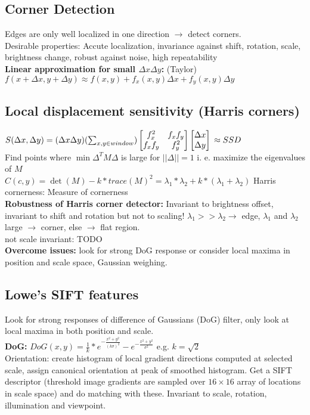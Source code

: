 \subsection*{Corner Detection}
Edges are only well localized in one direction $\rightarrow$ detect corners.\\
Desirable properties: Accute localization, invariance against shift, rotation, scale, brightness change, robust against noise, high repeatability\\
\textbf{Linear approximation for small $\Delta x \Delta y$:} (Taylor) $f(x + \Delta x, y + \Delta y) \approx f(x, y) + f_x(x, y) \Delta x + f_y(x, y)\Delta y$\\
\subsection*{Local displacement sensitivity (Harris corners)}
$S (\Delta x, \Delta y) = (\Delta x \Delta y) (\sum_{x, y \in window })
\begin{bmatrix} 
    f_x^{2} & f_x f_y \\ 
    f_x  f_y & f_y^{2} 
\end{bmatrix} 
\begin{bmatrix} 
    \Delta x \\ 
    \Delta y
\end{bmatrix}\\
\approx SSD$\\
Find points where $\min \Delta^T M \Delta$ is large for $||\Delta || = 1$ i. e. maximize the eigenvalues of $M$\\
$C(c, y) = \det(M) - k * trace(M)^{2} = \lambda_1 * \lambda_2 + k * (\lambda_1 + \lambda_2)$ Harris cornerness: Measure of cornerness\\
\textbf{Robustness of Harris corner detector:} Invariant to brightness offset, invariant to shift and rotation but not to scaling!
$\lambda_1 >> \lambda_2 \rightarrow$ edge, $\lambda_1$ and $ \lambda_2$ large $\rightarrow$ corner, else $\rightarrow$ flat region.\\
not scale invariant: TODO\\
\textbf{Overcome issues:} look for strong DoG response or consider local maxima in position and scale space, Gaussian weighing.
\subsection*{Lowe's SIFT features}
Look for strong responses of difference of Gaussians (DoG) filter, only look at local maxima in both position and scale.\\
\textbf{DoG:} $DoG(x, y) = \frac{1}{k}* e^{-\frac{x^{2} + y^{2}}{(k\sigma)^{2}}} - e^{-\frac{x^{2} + y^{2}}{\sigma^{2}}}$ e.g. $k = \sqrt{2}$\\
Orientation: create histogram of local gradient directions computed at selected scale, assign canonical orientation at peak of smoothed histogram. Get a SIFT descriptor (threshold image gradients are sampled over $16\times 16$ array of locations in scale space) and do matching with these. Invariant to scale, rotation, illumination and viewpoint.